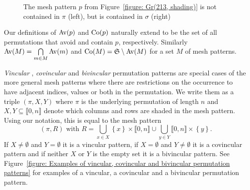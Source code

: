 \begin{example}
\begin{figure}[htbp]
    \caption{The mesh pattern $p$ from Figure~\ref{figure: Gr(213, shading)} is 
    not contained in $\pi$ (left), but is contained in $\sigma$ (right)}
    \label{figure:p not in pi and p in sigma}
  \end{figure}
\end{example}

Our definitions of ${\mathrm{Av}\!\left(p\right)}$ and ${\mathrm{Co}\!\left(p\right)}$ naturally extend to be the set of all 
permutations that avoid and contain $p$, respectively. Similarly ${\mathrm{Av}\!\left(M\right)} = 
\bigcap\limits_{m \in M}{\mathrm{Av}\!\left(m\right)}$ and ${\mathrm{Co}\!\left(M\right)} = \mathfrak{S} \setminus {\mathrm{Av}\!\left(M\right)}$ for a set $M$ 
of mesh patterns.

\emph{Vincular} \cite{babson_generalized_2000}, \emph{covincular} 
\cite{bean_enumerations_2017} and \emph{bivincular} 
\cite{bousquet-melou_2+2-free_2010} permutation patterns are special cases of 
the more general mesh patterns where there are restrictions on the occurrence to 
have adjacent indices, values or both in the permutation. We write them as a 
triple $(\pi, X, Y)$ where $\pi$ is the underlying permutation of length $n$ and 
$X,Y \subseteq \llbracket 0, n \rrbracket$ denote which columns and rows are 
shaded in the mesh pattern. Using our notation, this is equal to the mesh 
pattern \[ (\pi, R) \text{ with } R = \bigcup_{ x \in X }{ \left\{ x \right\} 
\times \llbracket 0, n \rrbracket } \cup \bigcup_{ y \in Y }{ \llbracket 0, n 
\rrbracket \times \left\{ y \right\} } .\] If $X \neq \emptyset$ and $Y = 
\emptyset$ it is a vincular pattern, if $X = \emptyset$ and $Y \neq \emptyset$ 
it is a covincular pattern and if neither $X$ or $Y$ is the empty set it is a 
bivincular pattern. See Figure~\ref{figure: Examples of vincular, covincular 
and bivincular permutation patterns} for examples of a vincular, a covincular 
and a bivincular permutation pattern.

